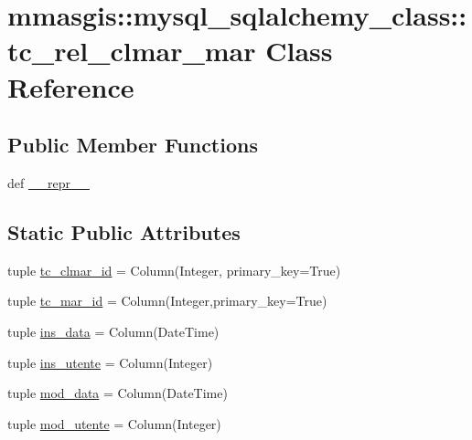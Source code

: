 \hypertarget{classmmasgis_1_1mysql__sqlalchemy__class_1_1tc__rel__clmar__mar}{
\section{mmasgis::mysql\_\-sqlalchemy\_\-class::tc\_\-rel\_\-clmar\_\-mar Class Reference}
\label{classmmasgis_1_1mysql__sqlalchemy__class_1_1tc__rel__clmar__mar}
}
\subsection*{Public Member Functions}
\begin{DoxyCompactItemize}
\item 
def \hyperlink{classmmasgis_1_1mysql__sqlalchemy__class_1_1tc__rel__clmar__mar_a196cc82f059b03696dd661770424b450}{\_\-\_\-repr\_\-\_\-}
\end{DoxyCompactItemize}
\subsection*{Static Public Attributes}
\begin{DoxyCompactItemize}
\item 
tuple \hyperlink{classmmasgis_1_1mysql__sqlalchemy__class_1_1tc__rel__clmar__mar_aa273ddf18bc5f0a576defcfc1f7f3f96}{tc\_\-clmar\_\-id} = Column(Integer, primary\_\-key=True)
\item 
tuple \hyperlink{classmmasgis_1_1mysql__sqlalchemy__class_1_1tc__rel__clmar__mar_a6337cfd6a351c7e8c340ba3792c8f2e0}{tc\_\-mar\_\-id} = Column(Integer,primary\_\-key=True)
\item 
tuple \hyperlink{classmmasgis_1_1mysql__sqlalchemy__class_1_1tc__rel__clmar__mar_a0b4180b1b4d1ce2d35cd4fcf75feadc3}{ins\_\-data} = Column(DateTime)
\item 
tuple \hyperlink{classmmasgis_1_1mysql__sqlalchemy__class_1_1tc__rel__clmar__mar_ac4179b225a31100892efdb06f18d5ed7}{ins\_\-utente} = Column(Integer)
\item 
tuple \hyperlink{classmmasgis_1_1mysql__sqlalchemy__class_1_1tc__rel__clmar__mar_aa6d812283fede14de009637c55651004}{mod\_\-data} = Column(DateTime)
\item 
tuple \hyperlink{classmmasgis_1_1mysql__sqlalchemy__class_1_1tc__rel__clmar__mar_aa9a64ac264b2b7886d42662091b49d22}{mod\_\-utente} = Column(Integer)
\end{DoxyCompactItemize}
